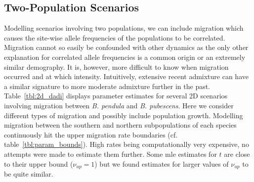 \documentclass[hidelinks,11pt]{article}
\newcommand{\pendula}{\textit{B. pendula}}
\newcommand{\pubescens}{\textit{B. pubescens}}
\begin{document}
    \subsection{Two-Population Scenarios}

    Modelling scenarios involving two populations, we can include migration which causes the site-wise allele frequencies of the populations to be correlated. Migration cannot so easily be confounded with other dynamics as the only other explanation for correlated allele frequencies is a common origin or an extremely similar demography. It is, however, more difficult to know when migration occurred and at which intensity. Intuitively, extensive recent admixture can have a similar signature to more moderate admixture further in the past. Table~\ref{tbl:2d_dadi} displays parameter estimates for several 2D scenarios involving migration between \pendula{} and \pubescens{}. Here we consider different types of migration and possibly include population growth. Modelling migration between the southern and northern subpopulations of each species continuously hit the upper migration rate boundaries (cf. table~\ref{tbl:param_bounds}). High rates being computationally very expensive, no attempts were made to estimate them further. Some \acrshort{mle} estimates for $t$ are close to their upper bound ($\nu_{up} = 1$) but we found estimates for larger values of $\nu_{up}$ to be quite similar.
\end{document}
